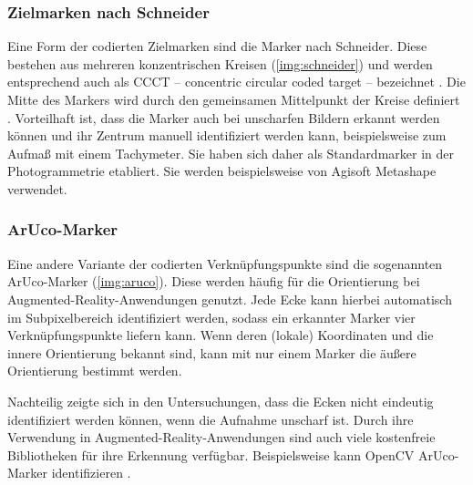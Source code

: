 \documentclass[./00PhotoBox.tex]{subfiles}
\begin{document}
\subsubsection{Zielmarken nach Schneider}
Eine Form der codierten Zielmarken sind die Marker nach Schneider. Diese bestehen aus mehreren konzentrischen Kreisen (\autoref{img:schneider}) und werden entsprechend auch als CCCT -- concentric circular coded target -- bezeichnet \citep{ccct}. Die Mitte des Markers wird durch den gemeinsamen Mittelpunkt der Kreise definiert \citep{schneider}. Vorteilhaft ist, dass die Marker auch bei unscharfen Bildern erkannt werden können und ihr Zentrum manuell identifiziert werden kann, beispielsweise zum Aufmaß mit einem Tachymeter. Sie haben sich daher als Standardmarker in der Photogrammetrie etabliert. Sie werden beispielsweise von Agisoft Metashape verwendet.


\subsubsection{ArUco-Marker}
Eine andere Variante der codierten Verknüpfungspunkte sind die sogenannten ArUco-Marker (\autoref{img:aruco}). Diese werden häufig für die Orientierung bei Augmented-Reality-An\-wend\-ungen genutzt. Jede Ecke kann hierbei automatisch im Subpixelbereich identifiziert werden, sodass ein erkannter Marker vier Verknüpfungspunkte liefern kann. Wenn deren (lokale) Koordinaten und die innere Orientierung bekannt sind, kann mit nur einem Marker die äußere Orientierung bestimmt werden. \citep[S. 545]{luhmann}

Nachteilig zeigte sich in den Untersuchungen, dass die Ecken nicht eindeutig identifiziert werden können, wenn die Aufnahme unscharf ist. Durch ihre Verwendung in Augmented-Reality-Anwendungen sind auch viele kostenfreie Bibliotheken für ihre Erkennung verfügbar. Beispielsweise kann OpenCV ArUco-Marker identifizieren \citep{opencv}.
\end{document}
